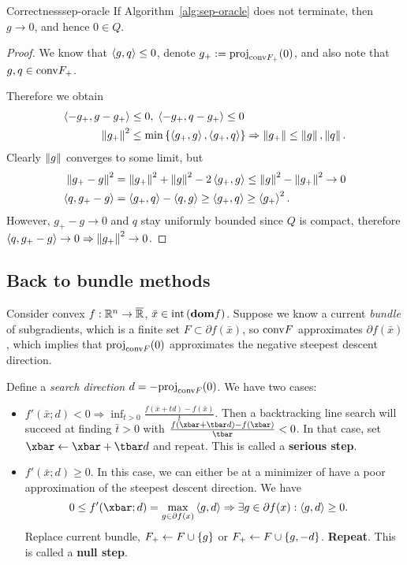 \begin{ctheorem}{Correctness}{sep-oracle}
	If Algorithm~\ref{alg:sep-oracle} does not terminate, then $g \to 0$, and
	hence $0 \in Q$.
\end{ctheorem}
\begin{proof}
	We know that $\left\langle g, q \right\rangle \leq 0$, denote $g_+ :=
	\mathrm{proj}_{\mathrm{conv}{F_+}}(0)$, and also note that $g, q \in
	\mathrm{conv}{F_+}$.

	Therefore we obtain
	\begin{align*}
		\left\langle -g_+, g - g_+ \right\rangle &\leq 0, \; \left\langle -g_+, q - g_+ \right\rangle \leq 0 \\
		\left \| g_+ \right \|^2 &\leq \min\left\{ \left\langle g_+, g \right\rangle, \left\langle g_+, q \right\rangle \right\} \Rightarrow
			\left \| g_+ \right \| \leq \left \| g \right \|, \left \| q \right \|.
	\end{align*}
	Clearly $\left \| g \right \|$ converges to some limit, but
	\begin{align*}
		\left \| g_+ - g \right \|^2 &= \left \| g_+ \right \|^2 + \left \| g \right \|^2 - 2\left\langle g_+, g \right\rangle \leq
		\left \| g \right \|^2 - \left \| g_+ \right \|^2 \to 0 \\
		\left\langle q, g_+ - g \right\rangle &= \left\langle g_+, q \right\rangle - \left\langle q, g \right\rangle \geq \left\langle g_+, q \right\rangle \geq
		\left\langle g_+ \right\rangle^2.
	\end{align*}
	However, $g_+ - g \to 0$ and $q$ stay uniformly bounded since $Q$ is
	compact, therefore $\left\langle q, g_+ - g \right\rangle \to 0 \Rightarrow \left \| g_+ \right \|^2 \to 0$.
\end{proof}

\subsection{Back to bundle methods}
Consider convex $f : \mathbb{R}^n \to \overline{\mathbb{R}}$, $\bar{x} \in \mathrm{int}\left( \textbf{dom} f \right)$.
Suppose we know a current \textit{bundle} of subgradients, which is a finite
set $F \subset \partial f(\bar{x})$, so $\mathrm{conv}{F}$ approximates $\partial
f(\bar{x})$, which implies that $\mathrm{proj}_{\mathrm{conv}{F}}(0)$ approximates
the negative steepest descent direction.

Define a \textit{search direction} $d = -\mathrm{proj}_{\mathrm{conv}{F}}(0)$.
We have two cases:
\begin{itemize}
	\item $f'(\bar{x}; d) < 0 \Rightarrow \inf_{t > 0} \frac{f(\bar{x} + td) -
		f(\bar{x})}{t}$. Then a backtracking line search will succeed at
		finding $\bar{t} > 0$ with $\frac{f(\xbar + \tbar d) - f(\xbar)}{\tbar}
		< 0$. In that case, set $\xbar \gets \xbar + \tbar d$ and repeat.
		This is called a \textbf{serious step}.
	\item $f'(\bar{x}; d) \geq 0$. In this case, we can either be at a
		minimizer of have a poor approximation of the steepest descent
		direction. We have
		\begin{align*}
			0 &\leq f'(\xbar; d) = \max_{g \in \partial f(x)} \ip{g, d}
			\Rightarrow \exists g \in \partial f(x) : \ip{g, d} \geq 0.
		\end{align*}
		Replace current bundle, $F_+ \gets F \cup \left\{ g \right\}$ or
		$F_+ \gets F \cup \left\{ g, -d \right\}$. \textbf{Repeat}. This is called a
		\textbf{null step}.
\end{itemize}

